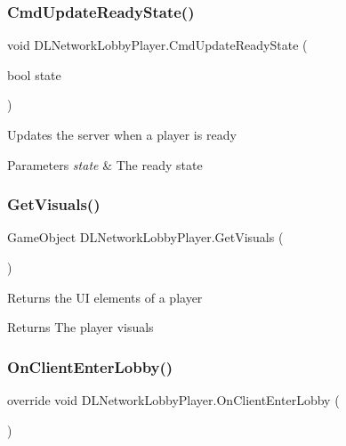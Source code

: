 \subsubsection{\texorpdfstring{Cmd\+Update\+Ready\+State()}{CmdUpdateReadyState()}}
{\footnotesize\ttfamily void D\+L\+Network\+Lobby\+Player.\+Cmd\+Update\+Ready\+State (\begin{DoxyParamCaption}\item[{bool}]{state }\end{DoxyParamCaption})}



Updates the server when a player is ready 


\begin{DoxyParams}{Parameters}
{\em state} & The ready state\\
\hline
\end{DoxyParams}
\hypertarget{class_d_l_network_lobby_player_a1302ddd493dfe54e7a90780320ff5c92}{}\label{class_d_l_network_lobby_player_a1302ddd493dfe54e7a90780320ff5c92} 
\subsubsection{\texorpdfstring{Get\+Visuals()}{GetVisuals()}}
{\footnotesize\ttfamily Game\+Object D\+L\+Network\+Lobby\+Player.\+Get\+Visuals (\begin{DoxyParamCaption}{ }\end{DoxyParamCaption})}



Returns the UI elements of a player 

\begin{DoxyReturn}{Returns}
The player visuals
\end{DoxyReturn}
\hypertarget{class_d_l_network_lobby_player_a0037d8d1e0f67839133610663a1d206f}{}\label{class_d_l_network_lobby_player_a0037d8d1e0f67839133610663a1d206f} 
\subsubsection{\texorpdfstring{On\+Client\+Enter\+Lobby()}{OnClientEnterLobby()}}
{\footnotesize\ttfamily override void D\+L\+Network\+Lobby\+Player.\+On\+Client\+Enter\+Lobby (\begin{DoxyParamCaption}{ }\end{DoxyParamCaption})}



